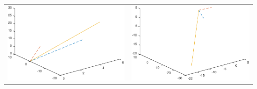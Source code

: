 \documentclass[12pt]{amsart}
\begin{document}
\begin{enumerate}
\begin{tabular}{cc}
\includegraphics[scale=.5]{hw1p4a.eps} & \includegraphics[scale=.5]{hw1p4b.eps} \\

\end{tabular}
\end{enumerate}
\end{document}
